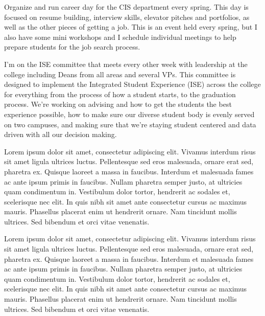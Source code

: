{
{Organize and run career day for the CIS department every spring.  This day is focused on resume building, interview skills, elevator pitches and portfolios, as well as the other pieces of getting a job.  This is an event held every spring, but I also have some mini workshops and I schedule individual meetings to help prepare students for the job search process.}

{I'm on the ISE committee that meets every other week with leadership at the college including Deans from all areas and several VPs.  This committee is designed to implement the Integrated Student Experience (ISE) across the college for everything from the process of how a student starts, to the graduation process.  We’re working on advising and how to get the students the best experience possible, how to make sure our diverse student body is evenly served on two campuses, and making sure that we’re staying student centered and data driven with all our decision making.}

{Lorem ipsum dolor sit amet, consectetur adipiscing elit. Vivamus interdum risus sit amet ligula ultrices luctus. Pellentesque sed eros malesuada, ornare erat sed, pharetra ex. Quisque laoreet a massa in faucibus. Interdum et malesuada fames ac ante ipsum primis in faucibus. Nullam pharetra semper justo, at ultricies quam condimentum in. Vestibulum dolor tortor, hendrerit ac sodales et, scelerisque nec elit. In quis nibh sit amet ante consectetur cursus ac maximus mauris. Phasellus placerat enim ut hendrerit ornare. Nam tincidunt mollis ultrices. Sed bibendum et orci vitae venenatis.}

{Lorem ipsum dolor sit amet, consectetur adipiscing elit. Vivamus interdum risus sit amet ligula ultrices luctus. Pellentesque sed eros malesuada, ornare erat sed, pharetra ex. Quisque laoreet a massa in faucibus. Interdum et malesuada fames ac ante ipsum primis in faucibus. Nullam pharetra semper justo, at ultricies quam condimentum in. Vestibulum dolor tortor, hendrerit ac sodales et, scelerisque nec elit. In quis nibh sit amet ante consectetur cursus ac maximus mauris. Phasellus placerat enim ut hendrerit ornare. Nam tincidunt mollis ultrices. Sed bibendum et orci vitae venenatis.}


}
